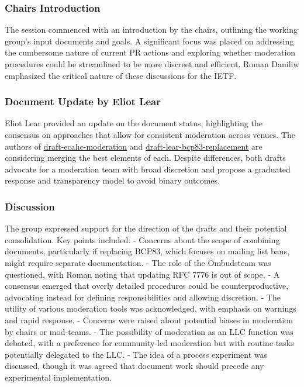 \documentclass{article}
\begin{document}
\subsubsection{Chairs Introduction}
The session commenced with an introduction by the chairs, outlining the working group's input documents and goals. A significant focus was placed on addressing the cumbersome nature of current PR actions and exploring whether moderation procedures could be streamlined to be more discreet and efficient. Roman Daniliw emphasized the critical nature of these discussions for the IETF.

\subsubsection{Document Update by Eliot Lear}
Eliot Lear provided an update on the document status, highlighting the consensus on approaches that allow for consistent moderation across venues. The authors of \href{https://datatracker.ietf.org/doc/html/draft-ecahc-moderation}{draft-ecahc-moderation} and \href{https://datatracker.ietf.org/doc/html/draft-lear-bcp83-replacement}{draft-lear-bcp83-replacement} are considering merging the best elements of each. Despite differences, both drafts advocate for a moderation team with broad discretion and propose a graduated response and transparency model to avoid binary outcomes.

\subsubsection{Discussion}
The group expressed support for the direction of the drafts and their potential consolidation. Key points included:
- Concerns about the scope of combining documents, particularly if replacing BCP83, which focuses on mailing list bans, might require separate documentation.
- The role of the Ombudsteam was questioned, with Roman noting that updating RFC 7776 is out of scope.
- A consensus emerged that overly detailed procedures could be counterproductive, advocating instead for defining responsibilities and allowing discretion.
- The utility of various moderation tools was acknowledged, with emphasis on warnings and rapid response.
- Concerns were raised about potential biases in moderation by chairs or mod-teams.
- The possibility of moderation as an LLC function was debated, with a preference for community-led moderation but with routine tasks potentially delegated to the LLC.
- The idea of a process experiment was discussed, though it was agreed that document work should precede any experimental implementation.
\end{document}
